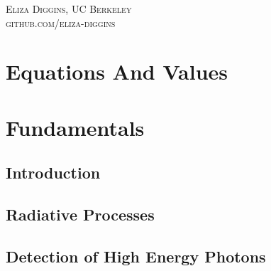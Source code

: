 \documentclass[11pt,fleqn]{book} %
\begin{document}

\noindent \textsc{Eliza Diggins, UC Berkeley}\\

\noindent \textsc{github.com/eliza-diggins}\\ %




\pagestyle{empty} %

\tableofcontents %


\pagestyle{fancy} %



\part{Equations And Values}


\part{Fundamentals}

\chapter{Introduction}

\chapter{Radiative Processes}

\chapter{Detection of High Energy Photons}

\end{document}
